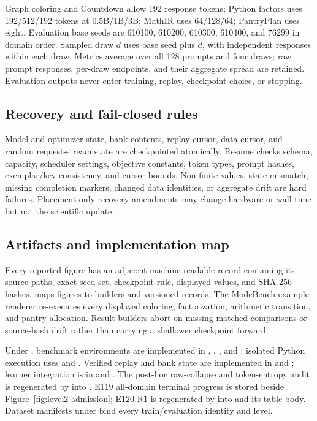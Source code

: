 Graph coloring and Countdown allow 192 response tokens; Python factors uses
192/512/192 tokens at 0.5B/1B/3B; MathIR uses 64/128/64; PantryPlan uses eight.
Evaluation base seeds are 610100, 610200, 610300, 610400, and 76299 in domain
order. Sampled draw $d$ uses base seed plus $d$, with independent responses
within each draw. Metrics average over all 128 prompts and four draws; raw
prompt responses, per-draw endpoints, and their aggregate spread are retained.
Evaluation outputs never enter training, replay, checkpoint choice, or stopping.

\subsection{Recovery and fail-closed rules}
\label{app:repro-recovery}

Model and optimizer state, bank contents, replay cursor, data cursor, and random
request-stream state are checkpointed atomically. Resume checks schema,
capacity, scheduler settings, objective constants, token types, prompt hashes,
exemplar/key consistency, and cursor bounds. Non-finite values, state mismatch,
missing completion markers, changed data identities, or aggregate drift are
hard failures. Placement-only recovery amendments may change hardware or wall
time but not the scientific update.

\subsection{Artifacts and implementation map}
\label{app:repro-artifacts}
\label{app:repro-code}

Every reported figure has an adjacent machine-readable record containing its
source paths, exact seed set, checkpoint rule, displayed values, and SHA-256
hashes.  maps figures to builders and versioned
records. The ModeBench example renderer re-executes every displayed coloring,
factorization, arithmetic transition, and pantry allocation. Result builders
abort on missing matched comparisons or source-hash drift rather than carrying a
shallower checkpoint forward.

Under , benchmark environments are implemented in
, , , and
; isolated Python execution uses
 and .
Verified replay and bank state are implemented in
 and ; learner
integration is in  and . The
post-hoc raw-collapse and token-entropy audit is regenerated by
 into
. E119 all-domain
terminal progress is stored beside Figure~\ref{fig:level2-admission}; E120-R1 is
regenerated by 
into  and its table body.
Dataset manifests under  bind every train/evaluation identity
and level.

